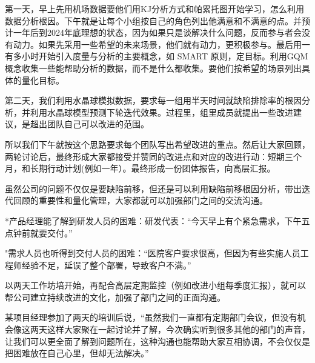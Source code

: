 第一天，早上先用机场数据要他们用KJ分析方式和帕累托图开始学习，怎么利用数据分析根因。下午就是让每个小组按自己的角色列出他满意和不满意的点。并预计一年后到2024年底理想的状态，因为如果只是谈解决什么问题，反而参与者会没有动力。如果先采用一些希望的未来场景，他们就有动力，更积极参与。最后用一有多小时开始引入度量与分析的主要概念，如
SMART
原则，定目标。利用GQM概念收集一些能帮助分析的数据，而不是什么都收集。要他们按希望的场景列出具体的量化目标。

第二天，我们利用水晶球模拟数据，要求每一组用半天时间就缺陷排除率的根因分析，并利用水晶球模型预测下轮迭代效果。过程里，组里成员就提出一些改进建议，是超出团队自己可以改进的范围。


所以我们下午就按这个思路要求每个团队写出希望改进的重点。然后让大家回顾，两轮讨论后，最终形成大家都接受并赞同的改进点和对应的改进行动：短期三个月，和长期行动计划(例如一年）。最终形成一份团体报告，向高层汇报。

虽然公司的问题不仅仅是要缺陷前移，但还是可以利用缺陷前移根因分析，带出迭代回顾的重要性和量化管理，大家都就可以加强部门之间的交流沟通。

*产品经理能了解到研发人员的困难：研发代表：“今天早上有个紧急需求，下午五点钟前就要交付。”

"需求人员也听得到交付人员的困难：“医院客户要求很高，但因为有些实施人员工程师经验不足，延误了整个部署，导致客户不满。”

以两天工作坊培开始，再配合高层定期监控（例如改进小组每季度汇报），就可以帮公司建立持续改进的文化，加强了部门之间的正面沟通。

某项目经理参加了两天的培训后说，``虽然我们一直都有定期部门会议，但没有机会像这两天这样大家聚在一起讨论并了解，今次确实听到很多其他的部门的声音，让我们可以更全面了解到问题所在，这种沟通也能帮助大家互相协调，不会仅仅是把困难放在自己心里，但却无法解决。''

